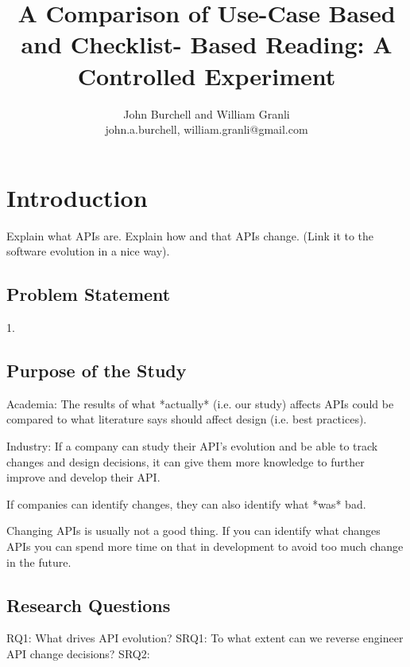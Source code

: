 \documentclass[10pt,twocolumn]{article}
\begin{document}
\title{A Comparison of Use-Case Based and Checklist-
Based Reading: A Controlled Experiment}

\author{John Burchell and William Granli \\
john.a.burchell, william.granli@gmail.com}


\maketitle
\thispagestyle{empty}


\section{Introduction}
Explain what APIs are. 
Explain how and that APIs change. (Link it to the software evolution in a nice way). 


\subsection{Problem Statement}
1. 

\subsection{Purpose of the Study}
Academia: 
The results of what *actually* (i.e. our study) affects APIs could be compared to what literature says should affect design (i.e. best practices). 

Industry: 
If a company can study their API's evolution and be able to track changes and design decisions, it can give them more knowledge to further improve and develop their API. 

If companies can identify changes, they can also identify what *was* bad.



Changing APIs is usually not a good thing. If you can identify what changes APIs you can spend more time on that in development to avoid too much change in the future. 


\subsection{Research Questions}
RQ1: What drives API evolution? 
SRQ1: To what extent can we reverse engineer API change decisions?
SRQ2: 
\end{document}
